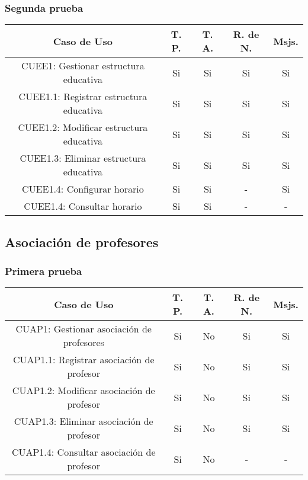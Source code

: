 \subsubsection{Segunda prueba}
\begin{center}
	\begin{tabular}{ |c|c|c|c|c| } 
		\hline
		Caso de Uso & T. P. & T. A. & R. de N. & Msjs. \\
		\hline 
		CUEE1: Gestionar estructura educativa & Si & Si & Si & Si \\ 
		CUEE1.1: Registrar estructura educativa & Si & Si & Si & Si \\ 
		CUEE1.2: Modificar estructura educativa & Si & Si & Si & Si \\ 
		CUEE1.3: Eliminar estructura educativa & Si & Si & Si & Si \\ 
		CUEE1.4: Configurar horario & Si & Si & - & Si \\  
		CUEE1.4: Consultar horario & Si & Si & - & - \\  
		\hline
	\end{tabular}
\end{center}


\subsection{Asociación de profesores}

\subsubsection{Primera prueba}
\begin{center}
	\begin{tabular}{ |c|c|c|c|c| } 
		\hline
		Caso de Uso & T. P. & T. A. & R. de N. & Msjs. \\
		\hline 
		CUAP1: Gestionar asociación de profesores & Si & No & Si & Si \\ 
		CUAP1.1: Registrar asociación de profesor & Si & No & Si & Si \\ 
		CUAP1.2: Modificar asociación de profesor & Si & No & Si & Si \\ 
		CUAP1.3: Eliminar asociación de profesor & Si & No & Si & Si \\ 
		CUAP1.4: Consultar asociación de profesor & Si & No & - & - \\ 
		\hline
	\end{tabular}
\end{center}

